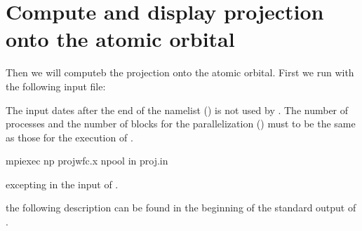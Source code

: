 \documentclass[letterpaper,10pt,pdftex,openany,english]{sphinxmanual}
\begin{document}
\section{Compute and display projection onto the atomic orbital}
\label{\detokenize{qe:compute-and-display-projection-onto-the-atomic-orbital}}
\sphinxAtStartPar
Then we will computeb the projection onto the atomic orbital.
First we run  with the following input file:

\sphinxAtStartPar
{}

\begin{sphinxVerbatim}[commandchars=\\\{\}]
     
 
\end{sphinxVerbatim}

\sphinxAtStartPar
The input dates after the end of the name\sphinxhyphen{}list  (\sphinxcode{\sphinxupquote{/}})
is not used by .
The number of processes and the number of blocks for
the \sphinxhyphen{}parallelization () must to be the same as those
for the execution of .

\begin{sphinxVerbatim}[commandchars=\\\{\}]
\PYGZdl{} mpiexec \PYGZhy{}np  projwfc.x \PYGZhy{}npool  \PYGZhy{}in proj.in
\end{sphinxVerbatim}

\sphinxAtStartPar
excepting  in the input of .

\sphinxAtStartPar
the following description can be found
in the beginning of the standard output of .
\end{document}
